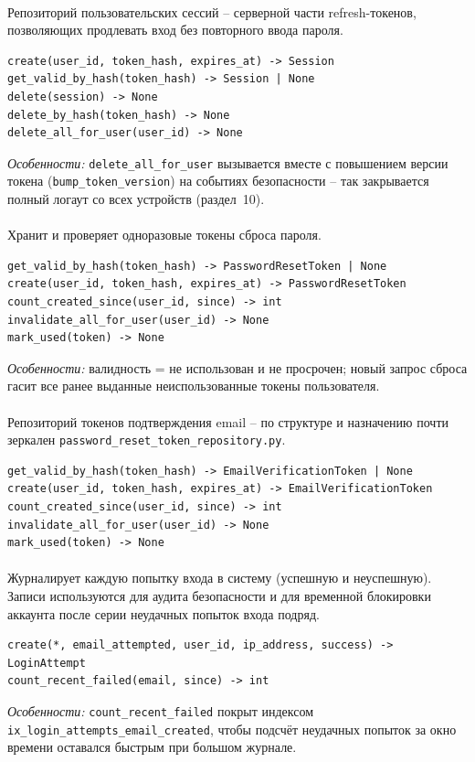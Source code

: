 \paragraph{}
Репозиторий пользовательских сессий -- серверной части refresh-токенов,
позволяющих продлевать вход без повторного ввода пароля.
\begin{verbatim}
create(user_id, token_hash, expires_at) -> Session
get_valid_by_hash(token_hash) -> Session | None
delete(session) -> None
delete_by_hash(token_hash) -> None
delete_all_for_user(user_id) -> None
\end{verbatim}
\textit{Особенности:} \texttt{delete_all_for_user} вызывается вместе с
повышением версии токена (\texttt{bump_token_version}) на событиях
безопасности -- так закрывается полный логаут со всех устройств
(раздел~10).

\paragraph{}
Хранит и проверяет одноразовые токены сброса пароля.
\begin{verbatim}
get_valid_by_hash(token_hash) -> PasswordResetToken | None
create(user_id, token_hash, expires_at) -> PasswordResetToken
count_created_since(user_id, since) -> int
invalidate_all_for_user(user_id) -> None
mark_used(token) -> None
\end{verbatim}
\textit{Особенности:} валидность = не использован и не просрочен; новый
запрос сброса гасит все ранее выданные неиспользованные токены
пользователя.

\paragraph{}
Репозиторий токенов подтверждения email -- по структуре и назначению
почти зеркален \texttt{password_reset_token_repository.py}.
\begin{verbatim}
get_valid_by_hash(token_hash) -> EmailVerificationToken | None
create(user_id, token_hash, expires_at) -> EmailVerificationToken
count_created_since(user_id, since) -> int
invalidate_all_for_user(user_id) -> None
mark_used(token) -> None
\end{verbatim}

\paragraph{}
Журналирует каждую попытку входа в систему (успешную и неуспешную).
Записи используются для аудита безопасности и для временной блокировки
аккаунта после серии неудачных попыток входа подряд.
\begin{verbatim}
create(*, email_attempted, user_id, ip_address, success) -> LoginAttempt
count_recent_failed(email, since) -> int
\end{verbatim}
\textit{Особенности:} \texttt{count_recent_failed} покрыт индексом
\texttt{ix_login_attempts_email_created}, чтобы подсчёт неудачных
попыток за окно времени оставался быстрым при большом журнале.

